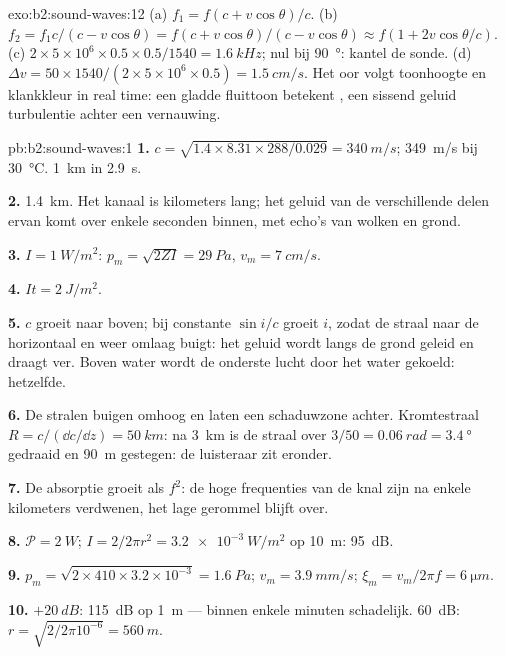 \begin{solution}{exo:b2:sound-waves:12}
(a) $f_1 = f(c + v\cos\theta)/c$. (b)
$f_2 = f_1c/(c - v\cos\theta) = f(c + v\cos\theta)
/(c - v\cos\theta) \approx f(1 + 2v\cos\theta/c)$.
(c) $2 \times 5 \times 10^6 \times 0.5 \times 0.5/1540
= \qty{1.6}{kHz}$;
nul bij \qty{90}{\degree}: kantel de sonde. (d)
$\Delta v = 50 \times 1540/
(2 \times 5 \times 10^6 \times 0.5) = \qty{1.5}{cm/s}$.
Het oor volgt toonhoogte en klankkleur in real time: een gladde fluittoon
betekent , een sissend geluid turbulentie achter een
vernauwing.
\end{solution}

\begin{solution}{pb:b2:sound-waves:1}
\textbf{1.} $c = \sqrt{1.4 \times 8.31 \times 288/0.029} = \qty{340}{m/s}$;
\qty{349}{m/s} bij \qty{30}{\degreeCelsius}. \qty{1}{km} in \qty{2.9}{s}.

\textbf{2.} \qty{1.4}{km}. Het kanaal is kilometers lang; het geluid van de
verschillende delen ervan komt over enkele seconden binnen, met echo's van
wolken en grond.

\textbf{3.} $I = \qty{1}{W/m^2}$: $p_m = \sqrt{2ZI} = \qty{29}{Pa}$,
$v_m = \qty{7}{cm/s}$.

\textbf{4.} $It = \qty{2}{J/m^2}$.

\textbf{5.} $c$ groeit naar boven; bij constante $\sin i/c$ groeit $i$,
zodat de straal naar de horizontaal en weer omlaag buigt: het geluid wordt
langs de grond geleid en draagt ver. Boven water wordt de onderste lucht
door het water gekoeld: hetzelfde.

\textbf{6.} De stralen buigen omhoog en laten een schaduwzone achter.
Kromtestraal $R = c/(\dd c/\dd z) = \qty{50}{km}$: na \qty{3}{km} is de
straal over $3/50 = \qty{0.06}{rad} = \qty{3.4}{\degree}$ gedraaid en
\qty{90}{m} gestegen: de luisteraar zit eronder.

\textbf{7.} De absorptie groeit als $f^2$: de hoge frequenties van de knal
zijn na enkele kilometers verdwenen, het lage gerommel blijft over.

\textbf{8.} $\mathcal P = \qty{2}{W}$;
$I = 2/2\pi r^2 = \qty{3.2e-3}{W/m^2}$ op \qty{10}{m}: \qty{95}{dB}.

\textbf{9.}
$p_m = \sqrt{2 \times 410 \times 3.2 \times 10^{-3}} = \qty{1.6}{Pa}$;
$v_m = \qty{3.9}{mm/s}$; $\xi_m = v_m/2\pi f = \qty{6}{\micro m}$.

\textbf{10.} $+\qty{20}{dB}$: \qty{115}{dB} op \qty{1}{m} --- binnen enkele
minuten schadelijk. \qty{60}{dB}: $r = \sqrt{2/2\pi10^{-6}} = \qty{560}{m}$.


\end{solution}
